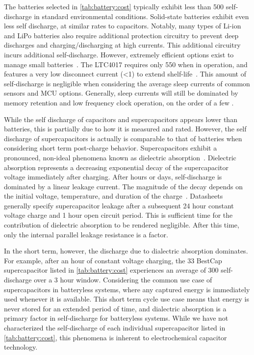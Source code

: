 The batteries selected in \cref{tab:battery:cost} typically exhibit less than 500\ssi{\nano\ampere} self-discharge in standard environmental conditions. Solid-state batteries exhibit even less self discharge, at similar rates to capacitors. Notably, many types of Li-ion and LiPo batteries also require additional protection circuitry to prevent deep discharges and charging/discharging at high currents. This additional circuitry incurs additional self-discharge. However, extremely efficient options exist to manage small batteries~\cite{ltc4071Datasheet,bq25505,adp5091}. The LTC4017 requires only 550\ssi{\nano\ampere} when in operation, and features a very low disconnect current (<1\ssi{\nano\ampere}) to extend shelf-life~\cite{ltc4071Datasheet}.
This amount of self-discharge is negligible when considering the average sleep currents of common sensors and MCU options. Generally, sleep currents will still be dominated by memory retention and low frequency clock operation, on the order of a few \ssi{\micro\ampere}. 

While the self discharge of capacitors and supercapacitors appears lower than batteries, this is partially due to how it is measured and rated. However, the self discharge of supercapacitors is actually is comparable to that of batteries when considering short term post-charge behavior.
Supercapacitors exhibit a pronounced, non-ideal phenomena known as dielectric absorption~\cite{kundert2008modeling}. Dielectric absorption represents a decreasing exponential decay of the supercapacitor voltage immediately after charging. After hours or days, self-discharge is dominated by a linear leakage current. The magnitude of the decay depends on the initial voltage, temperature, and duration of the charge~\cite{kowal2011detailed}. Datasheets generally specify supercapacitor leakage after a subsequent 24 hour constant voltage charge and 1 hour open circuit period. This is sufficient time for the contribution of dielectric absorption to be rendered negligible. After this time, only the internal parallel leakage resistance is a factor.

In the short term, however, the discharge due to dialectric absorption dominates. For example, after an hour of constant voltage charging, the 33\ssi{\milli\farad} BestCap supercapacitor listed in \cref{tab:battery:cost} experiences an average of 300\ssi{\nano\ampere} self-discharge over a 3 hour window. Considering the common use case of supercapacitors in batteryless systems, where any captured energy is immediately used whenever it is available. This short term cycle use case means that energy is never stored for an extended period of time, and dialectric absorption is a primary factor in self-discharge for batteryless systems. While we have not characterized the self-discharge of each individual supercapacitor listed in \cref{tab:battery:cost}, this phenomena is inherent to electrochemical capacitor technology.

